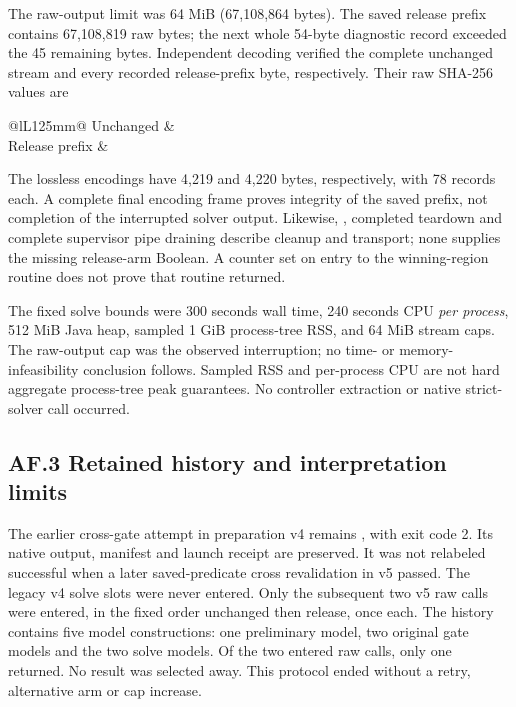 The raw-output limit was 64 MiB (67,108,864 bytes).
The saved release prefix contains 67,108,819 raw bytes; the next whole
54-byte diagnostic record exceeded the 45 remaining bytes.
Independent decoding verified the complete unchanged stream and every
recorded release-prefix byte, respectively. Their raw SHA-256 values are
\begin{center}\small
\begin{tabular}{@{}lL{125mm}@{}}
Unchanged & \\[3pt]
Release prefix & 
\end{tabular}
\end{center}
The lossless encodings have 4,219 and 4,220 bytes, respectively, with
78 records each. A complete final encoding frame proves integrity of
the saved prefix, not completion of the interrupted solver output.
Likewise, , completed teardown and complete
supervisor pipe draining describe cleanup and transport; none supplies
the missing release-arm Boolean. A counter set on entry to the winning-region
routine does not prove that routine returned.

The fixed solve bounds were 300 seconds wall time, 240 seconds CPU
\emph{per process}, 512 MiB Java heap, sampled 1 GiB process-tree RSS,
and 64 MiB stream caps. The raw-output cap was the observed interruption;
no time- or memory-infeasibility conclusion follows. Sampled RSS and
per-process CPU are not hard aggregate process-tree peak guarantees.
No controller extraction or native strict-solver call occurred.

\subsection*{AF.3 Retained history and interpretation limits}
The earlier cross-gate attempt in preparation v4 remains
, with exit code 2. Its native output, manifest and
launch receipt are preserved. It was not relabeled successful when a
later saved-predicate cross revalidation in v5 passed. The legacy v4
solve slots were never entered. Only the subsequent two v5 raw calls
were entered, in the fixed order unchanged then release, once each.
The history contains five model constructions: one preliminary model,
two original gate models and the two solve models. Of the two entered
raw calls, only one returned. No result was selected away. This protocol
ended without a retry, alternative arm or cap increase.

